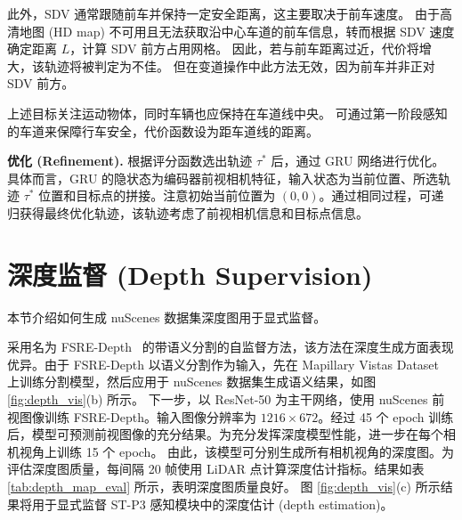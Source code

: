 此外，SDV 通常跟随前车并保持一定安全距离，这主要取决于前车速度。
%
由于高清地图 (HD map) 不可用且无法获取沿中心车道的前车信息，转而根据 SDV 速度确定距离 $L$，计算 SDV 前方占用网格。
%
因此，若与前车距离过近，代价将增大，该轨迹将被判定为不佳。
%
但在变道操作中此方法无效，因为前车并非正对 SDV 前方。

上述目标关注运动物体，同时车辆也应保持在车道线中央。
%
可通过第一阶段感知的车道来保障行车安全，代价函数设为距车道线的距离。


\noindent\textbf{优化 (Refinement).} 根据评分函数选出轨迹 $\tau^*$ 后，通过 GRU 网络进行优化。具体而言，GRU 的隐状态为编码器前视相机特征，输入状态为当前位置、所选轨迹 $\tau^*$ 位置和目标点的拼接。注意初始当前位置为 $(0,0)$。通过相同过程，可递归获得最终优化轨迹，该轨迹考虑了前视相机信息和目标点信息。








\section{深度监督 (Depth Supervision)}

本节介绍如何生成 nuScenes 数据集深度图用于显式监督。

采用名为 FSRE-Depth~\cite{Jung_2021_ICCV} 的带语义分割的自监督方法，该方法在深度生成方面表现优异。由于 FSRE-Depth 以语义分割作为输入，先在 Mapillary Vistas Dataset~\cite{Mapillary} 上训练分割模型，然后应用于 nuScenes 数据集生成语义结果，如图 \ref{fig:depth_vis}(b) 所示。
%
下一步，以 ResNet-50 为主干网络，使用 nuScenes 前视图像训练 FSRE-Depth。输入图像分辨率为 $1216 \times 672$。经过 45 个 epoch 训练后，模型可预测前视图像的充分结果。为充分发挥深度模型性能，进一步在每个相机视角上训练 15 个 epoch。
%
由此，该模型可分别生成所有相机视角的深度图。为评估深度图质量，每间隔 20 帧使用 LiDAR 点计算深度估计指标。结果如表 \ref{tab:depth_map_eval} 所示，表明深度图质量良好。
%
图 \ref{fig:depth_vis}(c) 所示结果将用于显式监督 ST-P3 感知模块中的深度估计 (depth estimation)。




